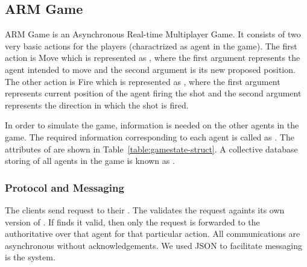 \subsection{ARM Game}

	ARM Game is an Asynchronous Real-time Multiplayer Game. It consists of two very basic actions for the players (charactrized as agent in the game). The first action is Move which is represented as \move{\agent}{\position}, where the first argument represents the agent intended to move and the second argument is its new proposed position. The other action is Fire which is represented as \fire{\position}{\direction}, where the first argument represents current position of the agent firing the shot and the second argument represents the direction in which the shot is fired.
	
	In order to simulate the game, information is needed on the other agents in the game. The required information corresponding to each agent is called as \agentstate. The attributes of \agentstate are shown in Table~\ref{table:gamestate-struct}. A collective database storing \agentstate of all agents in the game is  known as \gamestate.  
	
\subsubsection{Protocol and Messaging}

	The clients send request to their \localServers. The \localServer validates the request againts its own version of \gamestate. If \localServer finds it valid, then only the request is forwarded to the authoritative \localServers over that agent for that particular action. All communications are asynchronous without acknowledgements. We used JSON to facilitate messaging is the system.


	
